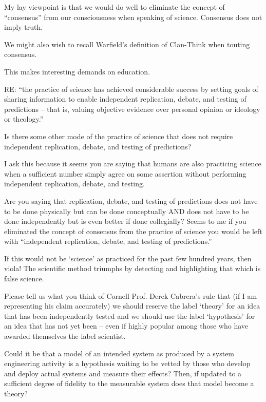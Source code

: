 My lay viewpoint is that we would do well to eliminate the concept of “consensus” from our consciousness when speaking of science. Consensus does not imply truth.

We might also wish to recall Warfield’s definition of Clan-Think when touting consensus.

This makes interesting demands on education.

RE: “the practice of science has achieved considerable success by setting goals of sharing information to enable independent replication, debate, and testing of predictions – that is, valuing objective evidence over personal opinion or ideology or theology.”

Is there some other mode of the practice of science  that does not require independent replication, debate, and testing of predictions?

I ask this because it seems you are saying that humans are also practicing science when a sufficient number simply agree on some assertion without performing independent replication, debate, and testing.

Are you saying that replication, debate, and testing of predictions does not have to be done physically but can be done conceptually AND does not have to be done independently but is even better if done collegially?
Seems to me if you eliminated the concept of consensus from the practice of science you would be left with “independent replication, debate, and testing of predictions.”

If this would not be ‘science’ as practiced for the past few hundred years, then viola! The scientific method triumphs by detecting and highlighting that which is false science.

Please tell us what you think of Cornell Prof. Derek Cabrera’s rule that (if I am representing his claim accurately) we should reserve the label ‘theory’ for an idea that has been independently tested and we should use the label ‘hypothesis’ for an idea that has not yet been – even if highly popular among those who have awarded themselves the label scientist.

Could it be that a model of an intended system as produced by a system engineering activity is a hypothesis waiting to be vetted by those who develop and deploy actual systems and measure their effects?  Then, if updated to a sufficient degree of fidelity to the measurable system does that model become a theory?